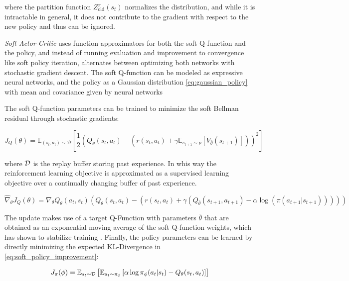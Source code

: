where the partition function $Z^\pi_\text{old}(s_t)$ normalizes the distribution, and while it is intractable in general, it does not contribute to the gradient with respect to the new policy and thus can be ignored.

\textit{Soft Actor-Critic} uses function approximators for both the soft Q-function and the policy, and instead of running evaluation and improvement to convergence
like soft policy iteration, alternates between optimizing both networks with stochastic gradient descent. The soft Q-function can be modeled
as expressive neural networks, and the policy as a Gaussian distribution \eqref{eq:gaussian_policy} with mean and covariance given by neural networks 

The soft Q-function parameters can be trained to minimize the soft Bellman residual through stochastic gradients:

\begin{equation*}
    J_Q(\theta) = \mathbb{E}_{(s_t,a_t) \sim \mathcal{D}} \left[ \frac{1}{2} \left( Q_\theta(s_t, a_t) - \left( r(s_t, a_t) + \gamma \mathbb{E}_{s_{t+1} \sim p} [V_{\bar{\theta}}(s_{t+1})] \right) \right)^2 \right]
\end{equation*}

where $\mathcal{D}$ is the replay buffer storing past experience. In whis way the reinforcement learning objective is approximated
as a supervised learning objective over a continually changing buffer of past experience.

\begin{equation*}
    \hat{\nabla}_\theta J_Q(\theta) = \nabla_\theta Q_\theta(a_t, s_t) \left( Q_\theta(s_t, a_t) - \left( r(s_t, a_t) + \gamma \left( Q_{\bar{\theta}}(s_{t+1}, a_{t+1}) - \alpha \log (\pi(a_{t+1} | s_{t+1})) \right) \right) \right)
\end{equation*}

The update makes use of a target Q-Function with parameters $\bar{\theta}$ that are obtained as an exponential moving average of the soft Q-function weights, which has shown to stabilize training \cite{DQN}.
Finally, the policy parameters can be learned by directly minimizing the expected KL-Divergence in \eqref{eq:soft_policy_improvement}:

\begin{equation}
    \label{eq:sac_actor_loss}
    J_\pi(\phi) = \mathbb{E}_{s_t \sim \mathcal{D}} \left[\mathbb{E}_{a_t \sim \pi_\phi} \left[\alpha \log{\pi_\phi(a_t|s_t)} - Q_\theta(s_t, a_t)\right]\right]
\end{equation}


